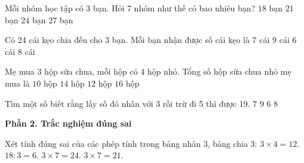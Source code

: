 \begin{ex} %
Mỗi nhóm học tập có 3 bạn. Hỏi 7 nhóm như thế có bao nhiêu bạn?
\choice
{$18$ bạn}
{\True $21$ bạn}
{$24$ bạn}
{$27$ bạn}
\end{ex}

\begin{ex} %
Có 24 cái kẹo chia đều cho 3 bạn. Mỗi bạn nhận được số cái kẹo là
\choice
{$7$ cái}
{$9$ cái}
{$6$ cái}
{\True $8$ cái}
\end{ex}

\begin{ex} %
Mẹ mua 3 hộp sữa chua, mỗi hộp có 4 hộp nhỏ. Tổng số hộp sữa chua nhỏ mẹ mua là
\choice
{$10$ hộp}
{$14$ hộp}
{\True $12$ hộp}
{$16$ hộp}
\end{ex}

\begin{ex} %
Tìm một số biết rằng lấy số đó nhân với 3 rồi trừ đi 5 thì được 19.
\choice
{$7$}
{$9$}
{$6$}
{\True $8$}
\end{ex}

\textbf{Phần 2. Trắc nghiệm đúng sai}

\begin{ex} %
Xét tính đúng sai của các phép tính trong bảng nhân 3, bảng chia 3:
\choiceTF
{\True $3 \times 4 = 12$.}
{\True $18 : 3 = 6$.}
{$3 \times 7 = 24$.}
{\True $3 \times 7 = 21$.}
\end{ex}

